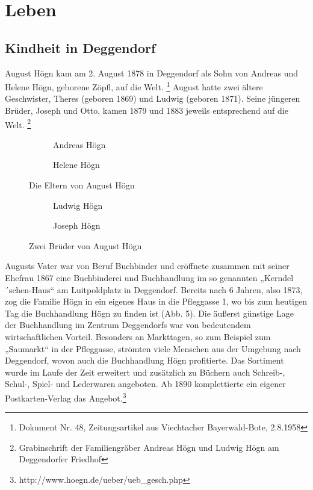 \section{Leben}

\subsection{Kindheit in
Deggendorf}


August Högn kam am 2. August 1878
in Deggendorf als Sohn von Andreas und Helene Högn, geborene Zöpfl, auf
die Welt. \footnote{Dokument Nr. 48, Zeitungsartikel aus Viechtacher
Bayerwald-Bote, 2.8.1958} August hatte zwei ältere Geschwister, Theres
(geboren 1869) und Ludwig (geboren 1871). Seine jüngeren Brüder, Joseph
und Otto, kamen 1879 und 1883 jeweils entsprechend auf die
Welt. \footnote{Grabinschrift der Familiengräber Andreas Högn und
Ludwig Högn am Deggendorfer Friedhof}

\begin{figure}
%
\begin{subfigure}[b]{0.5\linewidth}
\centering
{}
\caption{Andreas Högn}
\end{subfigure}
%
\begin{subfigure}[b]{0.5\linewidth}
\centering
{}
\caption{Helene Högn}
\end{subfigure}
%
\caption{Die Eltern von August Högn}
\end{figure}

\begin{figure}
%
\begin{subfigure}[b]{0.5\linewidth}
\centering
{}
\caption{Ludwig Högn}
\end{subfigure}
%
\begin{subfigure}[b]{0.5\linewidth}
\centering
{}
\caption{Joseph Högn}
\end{subfigure}
%
\caption{Zwei Brüder von August Högn}
\end{figure}

Augusts Vater war von Beruf Buchbinder und eröffnete zusammen mit seiner
Ehefrau 1867 eine Buchbinderei und Buchhandlung im so genannten
„Kerndel´schen-Haus“ am Luitpoldplatz in Deggendorf. Bereits nach 6
Jahren, also 1873, zog die Familie Högn in ein eigenes Haus in die
Pfleggasse 1, wo bis zum heutigen Tag die Buchhandlung Högn zu finden
ist (Abb. 5). Die äußerst günstige Lage der Buchhandlung im Zentrum
Deggendorfs war von bedeutendem wirtschaftlichen Vorteil. Besonders an
Markttagen, so zum Beispiel zum „Saumarkt“ in der Pfleggasse, strömten
viele Menschen aus der Umgebung nach Deggendorf, wovon auch die
Buchhandlung Högn profitierte. Das Sortiment wurde im Laufe der Zeit
erweitert und zusätzlich zu Büchern auch Schreib-, Schul-, Spiel- und
Lederwaren angeboten. Ab 1890 komplettierte ein eigener
Postkarten-Verlag das Angebot.\footnote{
http://www.hoegn.de/ueber/ueb\_gesch.php}

